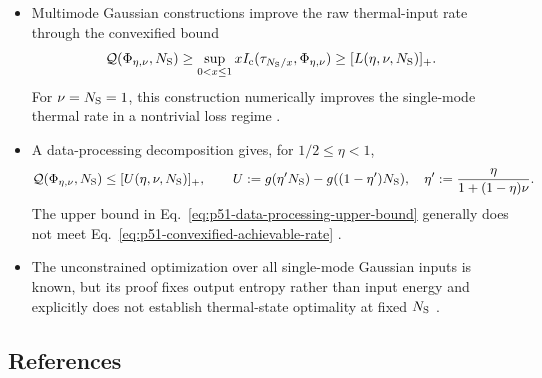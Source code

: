 \begin{itemize}
  \item Multimode Gaussian constructions improve the raw thermal-input rate
  through the convexified bound
  \begin{equation}
    \mathcal Q(\Phi_{\eta,\nu},N_{\rm S})
    \geq\sup_{0<x\leq1}
      xI_{\rm c}(\tau_{N_{\rm S}/x},\Phi_{\eta,\nu})
    \geq[L(\eta,\nu,N_{\rm S})]_+.
    \label{eq:p51-convexified-achievable-rate}
  \end{equation}
  For $\nu=N_{\rm S}=1$, this construction numerically improves the
  single-mode thermal rate in a nontrivial loss regime
  .

  \item A data-processing decomposition gives, for $1/2\leq\eta<1$,
  \begin{equation}
    \mathcal Q(\Phi_{\eta,\nu},N_{\rm S})
    \leq[U(\eta,\nu,N_{\rm S})]_+,
    \qquad
    U:=g(\eta'N_{\rm S})-g((1-\eta')N_{\rm S}),
    \quad
    \eta':=\frac{\eta}{1+(1-\eta)\nu}.
    \label{eq:p51-data-processing-upper-bound}
  \end{equation}
  The upper bound in Eq.~\eqref{eq:p51-data-processing-upper-bound} generally
  does not meet Eq.~\eqref{eq:p51-convexified-achievable-rate}
  .

  \item The unconstrained optimization over all single-mode Gaussian inputs
  is known, but its proof fixes output entropy rather than input energy and
  explicitly does not establish thermal-state optimality at fixed
  $N_{\rm S}$ .
\end{itemize}

\subsection*{References}


